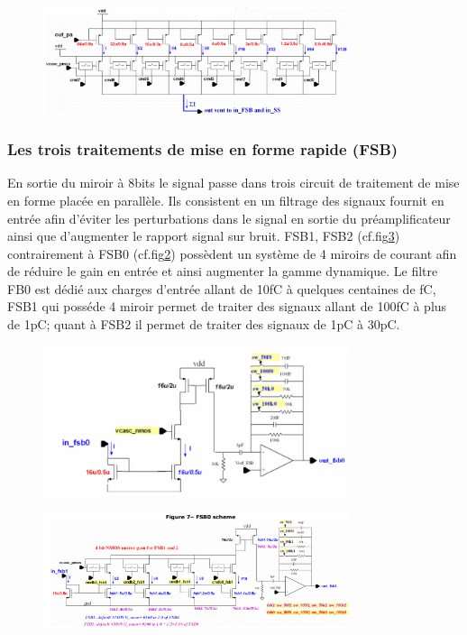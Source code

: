 \begin{figure}[h!]
	\centering
	\includegraphics[width=0.8\textwidth]{GLA/miror.png}
	\label{mirror}
\end{figure}

\subsubsection{Les trois traitements de mise en forme rapide (FSB)}
En sortie du miroir à 8bits le signal passe dans trois circuit de traitement de mise en forme placée en parallèle. Ils consistent en un filtrage des signaux fournit en entrée afin d'éviter les perturbations dans le signal en sortie du préamplificateur ainsi que d'augmenter le rapport signal sur bruit. FSB1, FSB2 (cf.fig\ref{fsb1}) contrairement à FSB0 (cf.fig\ref{fsb0}) possèdent un système de 4 miroirs de courant afin de réduire le gain en entrée et ainsi augmenter la gamme dynamique. Le filtre FB0 est dédié aux charges d'entrée allant de 10fC à quelques centaines de fC, FSB1 qui posséde 4 miroir permet de traiter des signaux allant de 100fC à plus de 1pC; quant à FSB2 il permet de traiter des signaux de 1pC à 30pC.
\begin{figure}[h!]
	\centering
	\includegraphics[width=0.8\textwidth]{GLA/FSB0.png}
	\label{fsb0}
\end{figure}
\begin{figure}[h!]
	\centering
	\includegraphics[width=0.8\textwidth]{GLA/FSB1.png}
	\label{fsb1}
\end{figure}
